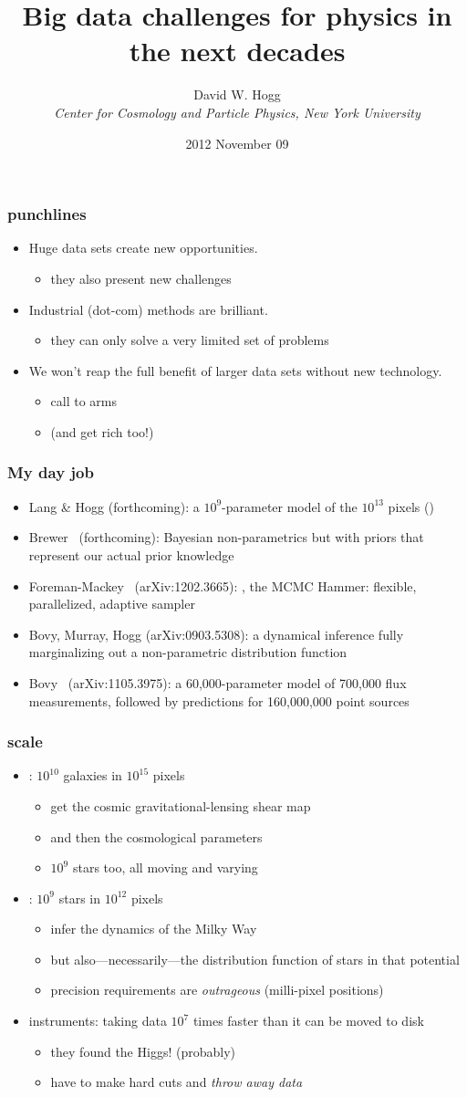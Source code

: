 \documentclass[pdftex]{beamer}
\title{Big data challenges for physics in the next decades}
\author[David W. Hogg (NYU)]{David W. Hogg \\
  \textsl{\small Center for Cosmology and Particle Physics,
                 New York University}}
\date{2012 November 09}
\newcommand{\conclusion}{
\begin{frame}
  \frametitle{punchlines}
  \begin{itemize}
  \item Huge data sets create new opportunities.
    \begin{itemize}
    \item they also present new challenges
    \end{itemize}
  \item Industrial (dot-com) methods are brilliant.
    \begin{itemize}
    \item they can only solve a very limited set of problems
    \end{itemize}
  \item We won't reap the full benefit of larger data sets without new technology.
    \begin{itemize}
    \item call to arms
    \item (and get rich too!)
    \end{itemize}
  \end{itemize}
\end{frame}
}
\begin{document}
\begin{frame}
  \titlepage
\end{frame}

\conclusion

\begin{frame}
  \frametitle{My day job}
  \begin{itemize}
  \item Lang \& Hogg {\small(forthcoming)}: a $10^9$-parameter model of the
    $10^{13}$  pixels ()
  \item Brewer \etal\ {\small(forthcoming)}: Bayesian non-parametrics but with
    priors that represent our actual prior knowledge
  \item Foreman-Mackey \etal\ {\small(arXiv:1202.3665)}:
    , the MCMC Hammer: flexible, parallelized, adaptive
    sampler
  \item Bovy, Murray, Hogg {\small(arXiv:0903.5308)}: a dynamical inference
    fully marginalizing out a non-parametric distribution function
  \item Bovy \etal\ {\small(arXiv:1105.3975)}: a 60,000-parameter model of
    700,000 flux measurements, followed by predictions for 160,000,000
    point sources
  \end{itemize}
\end{frame}

\begin{frame}
  \frametitle{scale}
  \begin{itemize}
  \item {}: $10^{10}$ galaxies in $10^{15}$ pixels
    \begin{itemize}
    \item get the cosmic gravitational-lensing shear map
    \item and then the cosmological parameters
    \item $10^9$ stars too, all moving and varying
    \end{itemize}
  \item {}: $10^{9}$ stars in $10^{12}$ pixels
    \begin{itemize}
    \item infer the dynamics of the Milky Way
    \item but also---necessarily---the distribution function of stars
      in that potential
    \item precision requirements are \emph{outrageous} (milli-pixel positions)
    \end{itemize}
  \item {} instruments: taking data $10^7$ times faster than it can be moved to disk
    \begin{itemize}
    \item they found the Higgs! (probably)
    \item have to make hard cuts and \emph{throw away data}
    \end{itemize}
  \end{itemize}
\end{frame}
\end{document}
